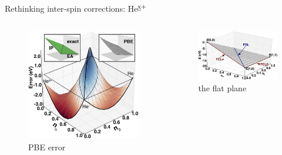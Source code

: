 \documentclass[xcolor=table,aspectratio=169]{beamer}
\numberwithin{equation}{section}
\begin{document}
\begin{frame}{Rethinking inter-spin corrections: He$\textsuperscript{\emph{x}+}$}

    \renewcommand{\figurename}{}
    \vspace{-2ex}
    \begin{columns}

        \begin{figure}
            \includegraphics[width=\columnwidth]{figures/fig_bajaj_2d_pwl.jpeg}
            \caption{PBE error}
        \end{figure}

        \begin{figure}[h!]
            \includegraphics[width=\columnwidth]{figures/fig_bajaj_abstracted_2d_pwl.jpg}
            \caption{the flat plane}
        \end{figure}


\end{columns}
\end{frame}
\end{document}
